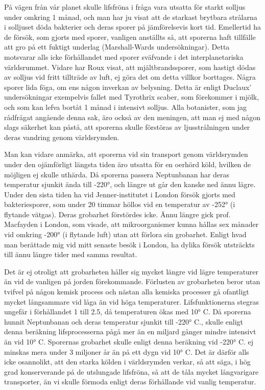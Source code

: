 \documentclass[a4paper, 12pt, oneside, swedish]{article}
\begin{document}
På vägen från vår planet skulle lifsfröna i fråga vara utsatta för starkt solljus under omkring 1 månad, och man har ju visat att de starkast brytbara strålarna i solljuset döda bakterier och deras sporer på jämförelsevis kort tid. Emellertid ha de försök, som gjorts med sporer, vanligen anställts så, att sporerna haft tillfälle att gro på ett fuktigt underlag (Marshall-Wards undersökningar). Detta motsvarar alls icke förhållandet med sporer sväfvande i det interplanetariska världsrummet. Vidare har Roux visat, att mjältbrandssporer, som hastigt dödas av solljus vid fritt tillträde av luft, ej göra det om detta villkor borttages. Några sporer lida föga, om ens någon inverkan av belysning. Detta är enligt Duclaux' undersökningar exempelvis fallet med Tyrothrix scaber, som förekommer i mjölk, och som kan lefva bortåt 1 månad i intensivt solljus. Alla botanister, som jag rådfrågat angående denna sak, äro också av den meningen, att man ej med någon slags säkerhet kan påstå, att sporerna skulle förstöras av ljusstrålningen under deras vandring genom världsrymden.

Man kan vidare anmärka, att sporerna vid sin transport genom världsrymden under den ojämförligt längsta tiden äro utsatta för en oerhörd köld, hvilken de möjligen ej skulle uthärda. Då sporerna passera Neptunbanan har deras temperatur sjunkit ända till -220°, och längre ut går den kanske ned ännu lägre. Under den sista tiden ha vid Jenner-institutet i London försök gjorts med bakteriesporer, som under 20 timmar höllos vid en temperatur av -252° (i flytande vätgas). Deras grobarhet förstördes icke. Ännu längre gick prof. Macfayden i London, som visade, att mikroorganismer kunna hållas sex månader vid omkring -200° (i flytande luft) utan att förlora sin grobarhet. Enligt hvad man berättade mig vid mitt senaste besök i London, ha dylika försök utsträckts till ännu längre tider med samma resultat.

Det är ej otroligt att grobarheten håller sig mycket längre vid lägre temperaturer än vid de vanligen på jorden förekommande. Förlusten av grobarheten beror utan tvifvel på någon kemisk process och nästan alla kemiska processer gå ofantligt mycket långsammare vid låga än vid höga temperaturer. Lifsfunktionerna stegras ungefär i förhållandet 1 till 2.5, då temperaturen ökas med 10° C. Då sporerna hunnit Neptunbanan och deras temperatur sjunkit till -220° C., skulle enligt denna beräkning lifsprocesserna pågå mer än en miljard gånger mindre intensivt än vid 10° C. Sporernas grobarhet skulle enligt denna beräkning vid -220° C. ej minskas mera under 3 miljoner år än på ett dygn vid 10° C. Det är därför alls icke osannolikt, att den starka kölden i världsrymden verkar, så att säga, i hög grad konserverande på de utslungade lifsfröna, så att de tåla mycket långvarigare transporter, än vi skulle förmoda enligt deras förhållande vid vanlig temperatur.
\end{document}
